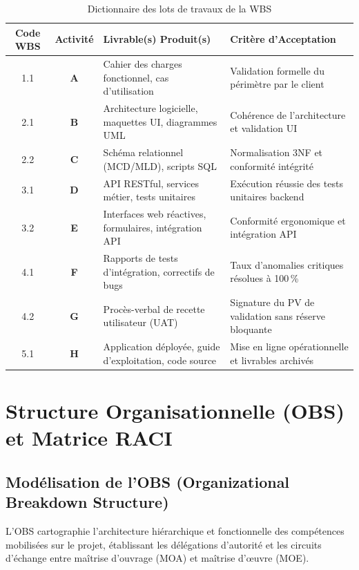 \documentclass[a4paper,12pt]{report}
\begin{document}
	\begin{table}[H]
		\centering
		\footnotesize
		\renewcommand{\arraystretch}{1.15}
		\caption{Dictionnaire des lots de travaux de la WBS}
		\label{tab:wbs_dict}
		\begin{tabularx}{\textwidth}{c c >{\raggedright\arraybackslash}X >{\raggedright\arraybackslash}X}
			\toprule
			\textbf{Code WBS} & \textbf{Activité} & \textbf{Livrable(s) Produit(s)} & \textbf{Critère d'Acceptation} \\
			\midrule
			1.1 & \textbf{A} & Cahier des charges fonctionnel, cas d'utilisation & Validation formelle du périmètre par le client \\
			2.1 & \textbf{B} & Architecture logicielle, maquettes UI, diagrammes UML & Cohérence de l'architecture et validation UI \\
			2.2 & \textbf{C} & Schéma relationnel (MCD/MLD), scripts SQL & Normalisation 3NF et conformité intégrité \\
			3.1 & \textbf{D} & API RESTful, services métier, tests unitaires & Exécution réussie des tests unitaires backend \\
			3.2 & \textbf{E} & Interfaces web réactives, formulaires, intégration API & Conformité ergonomique et intégration API \\
			4.1 & \textbf{F} & Rapports de tests d'intégration, correctifs de bugs & Taux d'anomalies critiques résolues à 100\,\% \\
			4.2 & \textbf{G} & Procès-verbal de recette utilisateur (UAT) & Signature du PV de validation sans réserve bloquante \\
			5.1 & \textbf{H} & Application déployée, guide d'exploitation, code source & Mise en ligne opérationnelle et livrables archivés \\
			\bottomrule
		\end{tabularx}
	\end{table}

	\chapter{Structure Organisationnelle (OBS) et Matrice RACI}
	\enlargethispage{2\baselineskip}
	
	\section{Modélisation de l'OBS (Organizational Breakdown Structure)}
	L'OBS cartographie l'architecture hiérarchique et fonctionnelle des compétences mobilisées sur le projet, établissant les délégations d'autorité et les circuits d'échange entre maîtrise d'ouvrage (MOA) et maîtrise d'œuvre (MOE).
	
\end{document}
